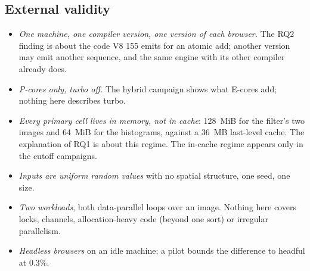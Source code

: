 \subsection{External validity}

\begin{itemize}[leftmargin=1.5em]
\item \emph{One machine, one compiler version, one version of each
browser.} The RQ2 finding is about the code V8 155 emits for an atomic add;
another version may emit another sequence, and the same engine with its
other compiler already does.
\item \emph{P-cores only, turbo off.} The hybrid campaign shows what
E-cores add; nothing here describes turbo.
\item \emph{Every primary cell lives in memory, not in cache}: 128~MiB for
the filter's two images and 64~MiB for the histograms, against a 36~MB
last-level cache. The explanation of RQ1 is about this regime. The in-cache
regime appears only in the cutoff campaigns.
\item \emph{Inputs are uniform random values} with no spatial structure,
one seed, one size.
\item \emph{Two workloads}, both data-parallel loops over an image. Nothing
here covers locks, channels, allocation-heavy code (beyond one sort) or
irregular parallelism.
\item \emph{Headless browsers} on an idle machine; a pilot bounds the
difference to headful at 0.3\%.
\end{itemize}

